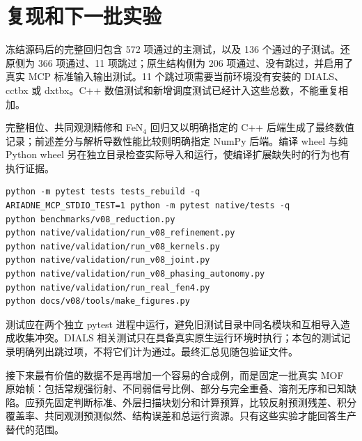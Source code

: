\section{复现和下一批实验}
冻结源码后的完整回归包含 572 项通过的主测试，以及 136 个通过的子测试。还原侧为 366 项通过、11 项跳过；原生结构侧为 206 项通过、没有跳过，并启用了真实 MCP 标准输入输出测试。11 个跳过项需要当前环境没有安装的 DIALS、cctbx 或 dxtbx。C++ 数值测试和新增调度测试已经计入这些总数，不能重复相加。

完整相位、共同观测精修和 FeN$_4$ 回归又以明确指定的 C++ 后端生成了最终数值记录；前述差分与解析导数性能比较则明确指定 NumPy 后端。编译 wheel 与纯 Python wheel 另在独立目录检查实际导入和运行，使编译扩展缺失时的行为也有执行证据。

\begin{lstlisting}
python -m pytest tests tests_rebuild -q
ARIADNE_MCP_STDIO_TEST=1 python -m pytest native/tests -q
python benchmarks/v08_reduction.py
python native/validation/run_v08_refinement.py
python native/validation/run_v08_kernels.py
python native/validation/run_v08_joint.py
python native/validation/run_v08_phasing_autonomy.py
python native/validation/run_real_fen4.py
python docs/v08/tools/make_figures.py
\end{lstlisting}
测试应在两个独立 pytest 进程中运行，避免旧测试目录中同名模块和互相导入造成收集冲突。DIALS 相关测试只在具备真实原生运行环境时执行；本包的测试记录明确列出跳过项，不将它们计为通过。最终汇总见随包验证文件。

接下来最有价值的数据不是再增加一个容易的合成例，而是固定一批真实 MOF 原始帧：包括常规强衍射、不同弱信号比例、部分与完全重叠、溶剂无序和已知缺陷。应预先固定判断标准、外层扫描块划分和计算预算，比较反射预测残差、积分覆盖率、共同观测预测似然、结构误差和总运行资源。只有这些实验才能回答生产替代的范围。
